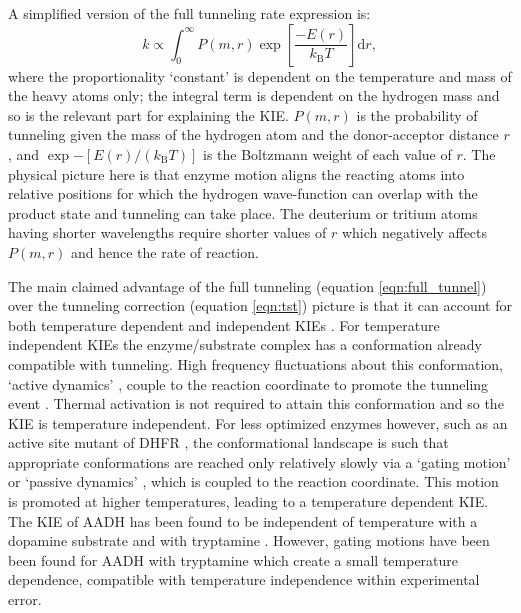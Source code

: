 A simplified version of the full tunneling rate expression \cite{knappTemperatureDependentIsotopeEffects2002, kohenRoleDynamicsEnzyme2015} is: 
\begin{equation}\label{eqn:full_tunnel}
k \propto \int_{0}^{\infty} P(m,r) \exp \left[\frac{-E(r) }{k_{\mathrm{B}} T}\right] \mathrm{d}r,
\end{equation}
where the proportionality `constant' is dependent on the temperature and mass of the heavy atoms only; the integral term is dependent on the hydrogen mass and so is the relevant part for explaining the KIE. $P(m, r)$ is the probability of tunneling given the mass of the hydrogen atom and the donor-acceptor distance $r$, and $\exp{-\left[E(r) /\left(k_{\mathrm{B}} T\right)\right]}$ is the Boltzmann weight of each value of $r$. The physical picture here is that enzyme motion aligns the reacting atoms into relative positions for which the hydrogen wave-function can overlap with the product state and tunneling can take place. The deuterium or tritium atoms having shorter wavelengths require shorter values of $r$ which negatively affects $P(m,r)$ and hence the rate of reaction. 

The main claimed advantage of the full tunneling (equation \ref{eqn:full_tunnel}) over the tunneling correction (equation \ref{eqn:tst}) picture is that it can account for both temperature dependent and independent KIEs \cite{klinmanbeyond2009, klinmanHydrogenTunnelingLinks2013}. For temperature independent KIEs the enzyme/substrate complex has a conformation already compatible with tunneling. High frequency fluctuations about this conformation, `active dynamics' \cite{masgrau2004hydrogen}, couple to the reaction coordinate to promote the tunneling event \cite{klinmanbeyond2009, klinmanHydrogenTunnelingLinks2013}. Thermal activation is not required to attain this conformation and so the KIE is temperature independent. For less optimized enzymes however, such as an active site mutant of DHFR \cite{stojkovic2012effects}, the conformational landscape is such that appropriate conformations are reached only relatively slowly via a `gating motion' \cite{johannissenProtonTunnelingAromatic2007} or `passive dynamics' \cite{masgrau2004hydrogen}, which is coupled to the reaction coordinate. This motion is promoted at higher temperatures, leading to a temperature dependent KIE. The KIE of AADH has been found to be independent of temperature with a dopamine substrate \cite{basranImportanceBarrierShape2001a} and with tryptamine \cite{masgrauAtomicDescriptionEnzyme2006}. However, gating motions have been been found for AADH with tryptamine \cite{johannissenEnzymeAromaticAmine2008, johannissenProtonTunnelingAromatic2007} which create a small temperature dependence, compatible with temperature independence within experimental error.

